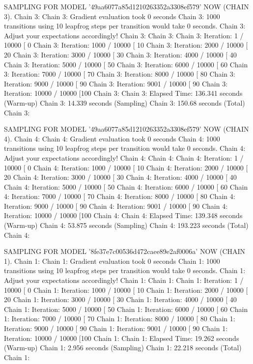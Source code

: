 \documentclass[
]{jss}
\begin{document}
\begin{CodeChunk}
\begin{CodeOutput}
SAMPLING FOR MODEL '49aa6077a85d1210263352a3308ef579' NOW (CHAIN 3).
Chain 3: 
Chain 3: Gradient evaluation took 0 seconds
Chain 3: 1000 transitions using 10 leapfrog steps per transition would take 0 seconds.
Chain 3: Adjust your expectations accordingly!
Chain 3: 
Chain 3: 
Chain 3: Iteration:    1 / 10000 [  0%
Chain 3: Iteration: 1000 / 10000 [ 10%
Chain 3: Iteration: 2000 / 10000 [ 20%
Chain 3: Iteration: 3000 / 10000 [ 30%
Chain 3: Iteration: 4000 / 10000 [ 40%
Chain 3: Iteration: 5000 / 10000 [ 50%
Chain 3: Iteration: 6000 / 10000 [ 60%
Chain 3: Iteration: 7000 / 10000 [ 70%
Chain 3: Iteration: 8000 / 10000 [ 80%
Chain 3: Iteration: 9000 / 10000 [ 90%
Chain 3: Iteration: 9001 / 10000 [ 90%
Chain 3: Iteration: 10000 / 10000 [100%
Chain 3: 
Chain 3:  Elapsed Time: 136.341 seconds (Warm-up)
Chain 3:                14.339 seconds (Sampling)
Chain 3:                150.68 seconds (Total)
Chain 3: 

SAMPLING FOR MODEL '49aa6077a85d1210263352a3308ef579' NOW (CHAIN 4).
Chain 4: 
Chain 4: Gradient evaluation took 0 seconds
Chain 4: 1000 transitions using 10 leapfrog steps per transition would take 0 seconds.
Chain 4: Adjust your expectations accordingly!
Chain 4: 
Chain 4: 
Chain 4: Iteration:    1 / 10000 [  0%
Chain 4: Iteration: 1000 / 10000 [ 10%
Chain 4: Iteration: 2000 / 10000 [ 20%
Chain 4: Iteration: 3000 / 10000 [ 30%
Chain 4: Iteration: 4000 / 10000 [ 40%
Chain 4: Iteration: 5000 / 10000 [ 50%
Chain 4: Iteration: 6000 / 10000 [ 60%
Chain 4: Iteration: 7000 / 10000 [ 70%
Chain 4: Iteration: 8000 / 10000 [ 80%
Chain 4: Iteration: 9000 / 10000 [ 90%
Chain 4: Iteration: 9001 / 10000 [ 90%
Chain 4: Iteration: 10000 / 10000 [100%
Chain 4: 
Chain 4:  Elapsed Time: 139.348 seconds (Warm-up)
Chain 4:                53.875 seconds (Sampling)
Chain 4:                193.223 seconds (Total)
Chain 4: 

SAMPLING FOR MODEL '8fe37e7c00536d472caee89e2af0006a' NOW (CHAIN 1).
Chain 1: 
Chain 1: Gradient evaluation took 0 seconds
Chain 1: 1000 transitions using 10 leapfrog steps per transition would take 0 seconds.
Chain 1: Adjust your expectations accordingly!
Chain 1: 
Chain 1: 
Chain 1: Iteration:    1 / 10000 [  0%
Chain 1: Iteration: 1000 / 10000 [ 10%
Chain 1: Iteration: 2000 / 10000 [ 20%
Chain 1: Iteration: 3000 / 10000 [ 30%
Chain 1: Iteration: 4000 / 10000 [ 40%
Chain 1: Iteration: 5000 / 10000 [ 50%
Chain 1: Iteration: 6000 / 10000 [ 60%
Chain 1: Iteration: 7000 / 10000 [ 70%
Chain 1: Iteration: 8000 / 10000 [ 80%
Chain 1: Iteration: 9000 / 10000 [ 90%
Chain 1: Iteration: 9001 / 10000 [ 90%
Chain 1: Iteration: 10000 / 10000 [100%
Chain 1: 
Chain 1:  Elapsed Time: 19.262 seconds (Warm-up)
Chain 1:                2.956 seconds (Sampling)
Chain 1:                22.218 seconds (Total)
Chain 1: 


\end{CodeOutput}
\end{CodeChunk}
\end{document}

